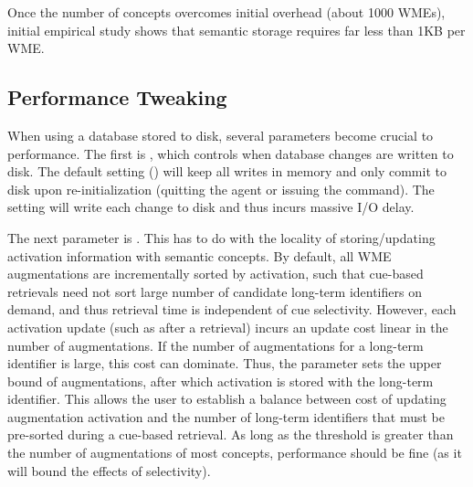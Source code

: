 Once the number of concepts overcomes initial overhead (about 1000 WMEs), initial empirical study shows that semantic storage requires far less than 1KB per WME.

\subsection{Performance Tweaking}

When using a database stored to disk, several parameters become crucial to performance.  The first is , which controls when database changes are written to disk.   The default setting () will keep all writes in memory and only commit to disk upon re-initialization (quitting the agent or issuing the  command).  The  setting will write each change to disk and thus incurs massive I/O delay.

The next parameter is . This has to do with the locality of storing/updating activation information with semantic concepts. By default, all WME augmentations are incrementally sorted by activation, such that cue-based retrievals need not sort large number of candidate long-term identifiers on demand, and thus retrieval time is independent of cue selectivity. However, each activation update (such as after a retrieval) incurs an update cost linear in the number of augmentations. If the number of augmentations for a long-term identifier is large, this cost can dominate. Thus, the  parameter sets the upper bound of augmentations, after which activation is stored with the long-term identifier. This allows the user to establish a balance between cost of updating augmentation activation and the number of long-term identifiers that must be pre-sorted during a cue-based retrieval. As long as the threshold is greater than the number of augmentations of most concepts, performance should be fine (as it will bound the effects of selectivity).

